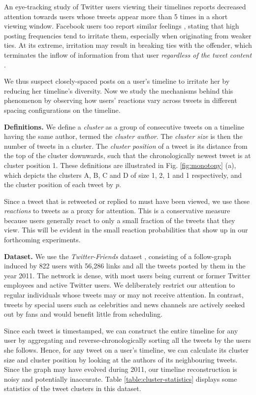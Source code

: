 \documentclass[onecolumn, 12 pt, doublespace, fullpage, letterpaper]{report}
\begin{document}
An eye-tracking study of Twitter users viewing their timelines \cite{counts2011taking} reports decreased attention towards users whose tweets appear more than 5 times in a short viewing window. Facebook users too report similar feelings \cite{koroleva2011cognition}, stating that high posting frequencies tend to irritate them, especially when originating from weaker ties. At its extreme, irritation may result in breaking ties with the offender, which terminates the inflow of information from that user \textit{regardless of the tweet content} \cite{kwak2011fragile}.

We thus suspect closely-spaced posts on a user's timeline to irritate her by reducing her timeline's diversity. Now we study the mechanisms behind this phenomenon by observing how users' reactions vary across tweets in different spacing configurations on the timeline.

\textbf{Definitions.} We define a \textit{cluster} as a group of consecutive tweets on a timeline having the same author, termed the \textit{cluster author}. The \textit{cluster size} is then the number of tweets in a cluster. The \textit{cluster position} of a tweet is its distance from the top of the cluster downwards, such that the chronologically newest tweet is at cluster position 1. These definitions are illustrated in Fig. \ref{fig:monotony} (a), which depicts the clusters A, B, C and D of size 1, 2, 1 and 1 respectively, and the cluster position of each tweet by $p$.

Since a tweet that is retweeted or replied to must have been viewed, we use these \textit{reactions} to tweets as a proxy for attention. This is a conservative measure because users generally react to only a small fraction of the tweets that they view. This will be evident in the small reaction probabilities that show up in our forthcoming experiments.

\textbf{Dataset.} We use the \textit{Twitter-Friends} dataset \cite{lin2014steering}, consisting of a follow-graph induced by 822 users with 56,286 links and all the tweets posted by them in the year 2011. The network is dense, with most users being current or former Twitter employees and active Twitter users. We deliberately restrict our attention to regular individuals whose tweets may or may not receive attention. In contrast, tweets by special users such as celebrities and news channels are actively seeked out by fans and would benefit little from scheduling.

Since each tweet is timestamped, we can construct the entire timeline for any user by aggregating and reverse-chronologically  sorting all the tweets by the users she follows. Hence, for any tweet on a user's timeline, we can calculate its cluster size and cluster position by looking at the authors of its neighbouring tweets. Since the graph may have evolved during 2011, our timeline reconstruction is noisy and potentially inaccurate. Table \ref{table:cluster-statistics} displays some statistics of the tweet clusters in this dataset.
\end{document}
